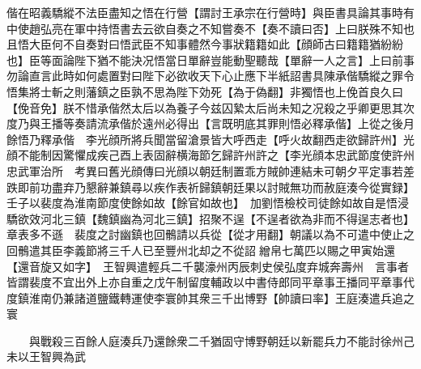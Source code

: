 偕在昭義驕縱不法臣盡知之悟在行營【謂討王承宗在行營時】與臣書具論其事時有中使趙弘亮在軍中持悟書去云欲自奏之不知嘗奏不【奏不讀曰否】上曰朕殊不知也且悟大臣何不自奏對曰悟武臣不知事體然今事狀籍籍如此【顔師古曰籍籍猶紛紛也】臣等面論陛下猶不能決况悟當日單辭豈能動聖聽哉【單辭一人之言】上曰前事勿論直言此時如何處置對曰陛下必欲收天下心止應下半紙詔書具陳承偕驕縱之罪令悟集將士斬之則藩鎮之臣孰不思為陛下効死【為于偽翻】非獨悟也上俛首良久曰【俛音免】朕不惜承偕然太后以為養子今兹囚縶太后尚未知之况殺之乎卿更思其次度乃與王播等奏請流承偕於遠州必得出【言既明底其罪則悟必釋承偕】上從之後月餘悟乃釋承偕　李光顔所將兵聞當留滄景皆大呼西走【呼火故翻西走欲歸許州】光顔不能制因驚懼成疾己酉上表固辭横海節乞歸許州許之【李光顔本忠武節度使許州忠武軍治所　考異曰舊光顔傳曰光顔以朝廷制置乖方賊帥連結未可朝夕平定事若差跌即前功盡弃乃懇辭兼鎮尋以疾作表祈歸鎮朝廷果以討賊無功而赦庭湊今從實録】　壬子以裴度為淮南節度使餘如故【餘官如故也】　加劉悟檢校司徒餘如故自是悟浸驕欲效河北三鎮【魏鎮幽為河北三鎮】招聚不逞【不逞者欲為非而不得逞志者也】章表多不遜　裴度之討幽鎮也回鶻請以兵從【從才用翻】朝議以為不可遣中使止之回鶻遣其臣李義節將三千人已至豐州北却之不從詔繒帛七萬匹以賜之甲寅始還【還音旋又如字】　王智興遣輕兵二千襲濠州丙辰刺史侯弘度弃城奔壽州　言事者皆謂裴度不宜出外上亦自重之戊午制留度輔政以中書侍郎同平章事王播同平章事代度鎮淮南仍兼諸道鹽鐵轉運使李寰帥其衆三千出博野【帥讀曰率】王庭湊遣兵追之寰

　　與戰殺三百餘人庭湊兵乃還餘衆二千猶固守博野朝廷以新罷兵力不能討徐州己未以王智興為武

